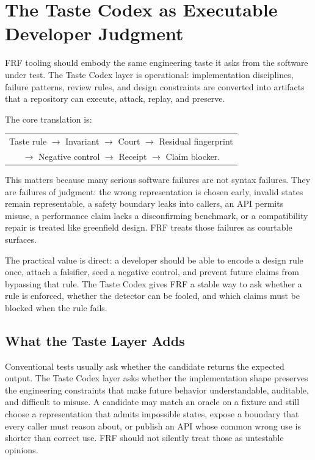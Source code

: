 \documentclass[11pt,a4paper]{article}
\newcommand{\frf}{\textsc{FRF}}
\begin{document}
\section{The Taste Codex as Executable Developer Judgment}
\label{sec:taste}

\frf{} tooling should embody the same engineering taste it asks from the software under test. The Taste Codex layer is operational: implementation disciplines, failure patterns, review rules, and design constraints are converted into artifacts that a repository can execute, attack, replay, and preserve.

The core translation is:
\begin{center}
\small
\begin{tabular}{c}
Taste rule \(\rightarrow\) Invariant \(\rightarrow\) Court \(\rightarrow\) Residual fingerprint\\
\(\rightarrow\) Negative control \(\rightarrow\) Receipt \(\rightarrow\) Claim blocker.
\end{tabular}
\end{center}

This matters because many serious software failures are not syntax failures. They are failures of judgment: the wrong representation is chosen early, invalid states remain representable, a safety boundary leaks into callers, an API permits misuse, a performance claim lacks a disconfirming benchmark, or a compatibility repair is treated like greenfield design. \frf{} treats those failures as courtable surfaces.

The practical value is direct: a developer should be able to encode a design rule once, attach a falsifier, seed a negative control, and prevent future claims from bypassing that rule. The Taste Codex gives \frf{} a stable way to ask whether a rule is enforced, whether the detector can be fooled, and which claims must be blocked when the rule fails.

\subsection{What the Taste Layer Adds}

Conventional tests usually ask whether the candidate returns the expected output. The Taste Codex layer asks whether the implementation shape preserves the engineering constraints that make future behavior understandable, auditable, and difficult to misuse. A candidate may match an oracle on a fixture and still choose a representation that admits impossible states, expose a boundary that every caller must reason about, or publish an API whose common wrong use is shorter than correct use. \frf{} should not silently treat those as untestable opinions.
\end{document}
